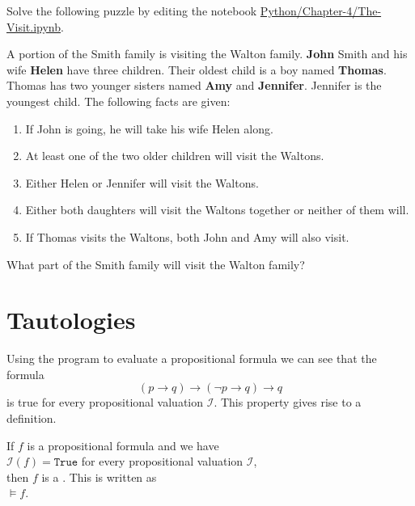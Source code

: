 \exerciseEng
Solve the following puzzle by editing the notebook \href{https://github.com/karlstroetmann/Logic/blob/master/Python/Chapter-4/The-Visit.ipynb}{Python/Chapter-4/The-Visit.ipynb}.

\begin{minipage}{0.95\linewidth}
  A portion of the Smith family is visiting the Walton family. \textbf{John} Smith and his wife \textbf{Helen} have three
  children. Their oldest child is a boy named \textbf{Thomas}. Thomas has two younger sisters named \textbf{Amy} and
  \textbf{Jennifer}. Jennifer is the youngest child. The following facts are given: 
  \begin{enumerate}
  \item If John is going, he will take his wife Helen along.
  \item At least one of the two older children will visit the Waltons.
  \item Either Helen or Jennifer will visit the Waltons.
  \item Either both daughters will visit the Waltons together or neither of them will.
  \item If Thomas visits the Waltons, both John and Amy will also visit.
  \end{enumerate}
What part of the Smith family will visit the Walton family?
\end{minipage}

\section{Tautologies}
Using the program to evaluate a propositional formula we can see that the formula
$$  (p \rightarrow q) \rightarrow (\neg p \rightarrow q) \rightarrow q $$
is true for every propositional valuation $\mathcal{I}$.  This property gives rise to a definition.

\begin{Definition}[Tautology]
  If $f$ is a propositional formula and we have  \\[0.2cm]
  \hspace{1.3cm} $\mathcal{I}(f) = \texttt{True}$ \quad for every propositional valuation $\mathcal{I}$, \\[0.2cm]
  then $f$ is a  .  This is written as \\[0.2cm]
  \hspace*{1.3cm} $\models f$.
  \eox
\end{Definition}

